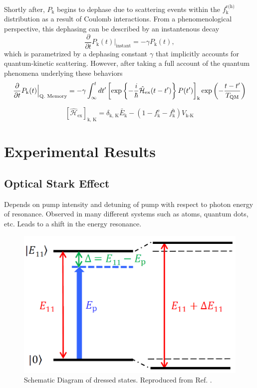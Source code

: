 Shortly after, $P_\text{k}$ begins to dephase due to scattering events within the $f_\text{k}^\text{e(h)}$ distribution as a result of Coulomb interactions. From a phenomenological perspective, this dephasing can be described by an instantenous decay
\begin{equation}
	\dfrac{\partial}{\partial t} P_\text{k}(t) \Big|_\text{instant} = -\gamma P_\text{k}(t),
\end{equation}
which is parametrized by a dephasing constant $\gamma$ that implicitly accounts for quantum-kinetic scattering. However, after taking a full account of the quantum phenomena underlying these behaviors
\begin{equation}
	\dfrac{\partial}{\partial t} P_\text{k}(t) \Big|_\text{Q. Memory} = -\gamma \int^{t}_{\infty} dt' \left[ \exp\left\{ - \frac{\small i}{ \small \hbar} \hat{\mathcal{H}}_\text{ex}(t-t') \right\} P(t') \right]_\text{k} \exp \left(- \frac{t-t'}{T_\text{QM}} \right)
\end{equation}

\begin{equation}
	\left[ \hat{\mathcal{H}}_\text{ex} \right]_\text{k, K}= \delta_\text{k, K} \tilde{E_\text{k}} - (1 - f_\text{k}^\text{e} - f_\text{k}^\text{h}) V_\text{k-K}
\end{equation}


\section{Experimental Results}

\subsection{Optical Stark Effect}

Depends on pump intensity and detuning of pump with respect to photon energy of resonance. Observed in many different systems such as atoms, quantum dots, etc. Leads to a shift in the energy resonance.
\begin{figure}[H]
	\centering
	\includegraphics[scale=0.5]{images/chapter_coherent/kankan_stark_effect.png}
	\caption{Schematic Diagram of dressed states. Reproduced from Ref. .}
\end{figure}


